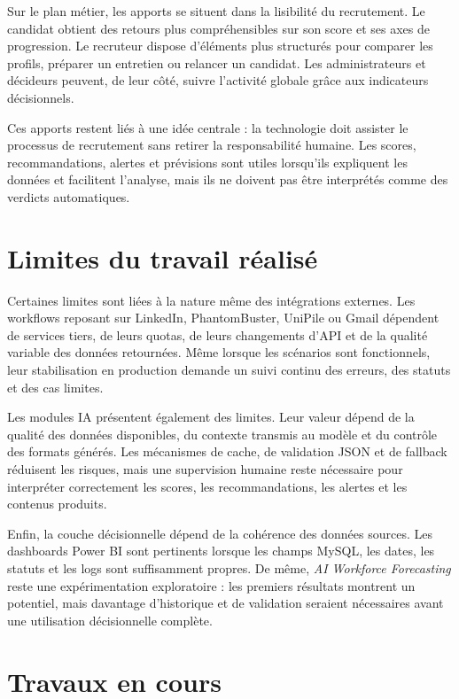Sur le plan métier, les apports se situent dans la lisibilité du recrutement. Le candidat obtient des retours plus compréhensibles sur son score et ses axes de progression. Le recruteur dispose d'éléments plus structurés pour comparer les profils, préparer un entretien ou relancer un candidat. Les administrateurs et décideurs peuvent, de leur côté, suivre l'activité globale grâce aux indicateurs décisionnels.

Ces apports restent liés à une idée centrale : la technologie doit assister le processus de recrutement sans retirer la responsabilité humaine. Les scores, recommandations, alertes et prévisions sont utiles lorsqu'ils expliquent les données et facilitent l'analyse, mais ils ne doivent pas être interprétés comme des verdicts automatiques.

\section{Limites du travail réalisé}

Certaines limites sont liées à la nature même des intégrations externes. Les workflows reposant sur LinkedIn, PhantomBuster, UniPile ou Gmail dépendent de services tiers, de leurs quotas, de leurs changements d'API et de la qualité variable des données retournées. Même lorsque les scénarios sont fonctionnels, leur stabilisation en production demande un suivi continu des erreurs, des statuts et des cas limites.

Les modules IA présentent également des limites. Leur valeur dépend de la qualité des données disponibles, du contexte transmis au modèle et du contrôle des formats générés. Les mécanismes de cache, de validation JSON et de fallback réduisent les risques, mais une supervision humaine reste nécessaire pour interpréter correctement les scores, les recommandations, les alertes et les contenus produits.

Enfin, la couche décisionnelle dépend de la cohérence des données sources. Les dashboards Power BI sont pertinents lorsque les champs MySQL, les dates, les statuts et les logs sont suffisamment propres. De même, \textit{AI Workforce Forecasting} reste une expérimentation exploratoire : les premiers résultats montrent un potentiel, mais davantage d'historique et de validation seraient nécessaires avant une utilisation décisionnelle complète.

\section{Travaux en cours}

